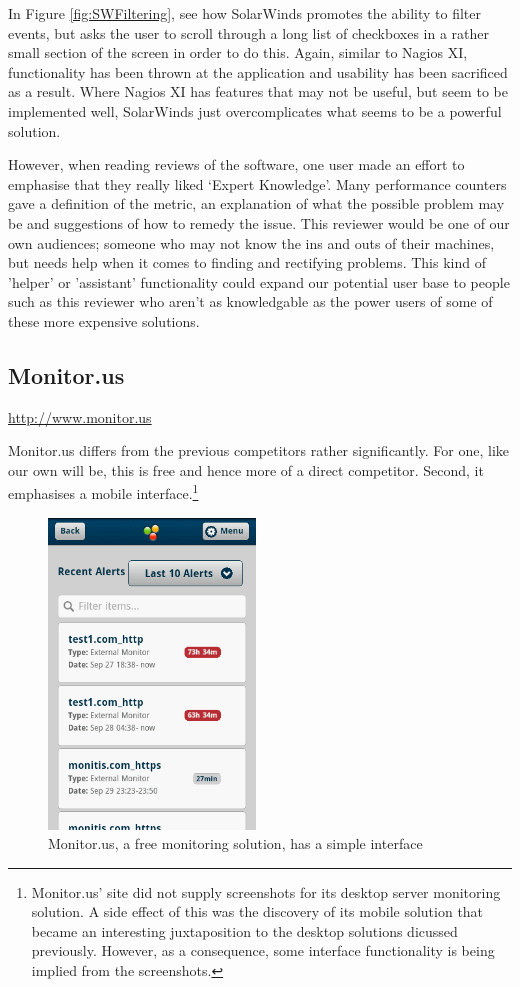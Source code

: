 \documentclass{l3proj}
\begin{document}
In Figure \ref{fig:SWFiltering}, see how SolarWinds promotes the ability to filter events, but asks the user to scroll through a long list of checkboxes in a rather small section of the screen in order to do this. Again, similar to Nagios XI, functionality has been thrown at the application and usability has been sacrificed as a result. Where Nagios XI has features that may not be useful, but seem to be implemented well, SolarWinds just overcomplicates what seems to be a powerful solution.

However, when reading reviews of the software, one user made an effort to emphasise that they really liked ‘Expert Knowledge’. Many performance counters gave a definition of the metric, an explanation of what the possible problem may be and suggestions of how to remedy the issue. This reviewer would be one of our own audiences; someone who may not know the ins and outs of their machines, but needs help when it comes to finding and rectifying problems. This kind of 'helper' or 'assistant' functionality could expand our potential user base to people such as this reviewer who aren't as knowledgable as the power users of some of these more expensive solutions.

\subsection{Monitor.us}

\url{http://www.monitor.us}

Monitor.us differs from the previous competitors rather significantly. For one, like our own will be, this is free and hence more of a direct competitor. Second, it emphasises a mobile interface.\footnote{\raggedright{}Monitor.us' site did not supply screenshots for its desktop server monitoring solution. A side effect of this was the discovery of its mobile solution that became an interesting juxtaposition to the desktop solutions dicussed previously. However, as a consequence, some interface functionality is being implied from the screenshots.}

\begin{figure}[H]
\centering
\includegraphics[width=55mm]
{Competitors/MonitorUS_iPhoneAlerts.png}
\caption{Monitor.us, a free monitoring solution, has a simple interface}
\label{fig:MUSiPhone1}
\end{figure}
\end{document}

